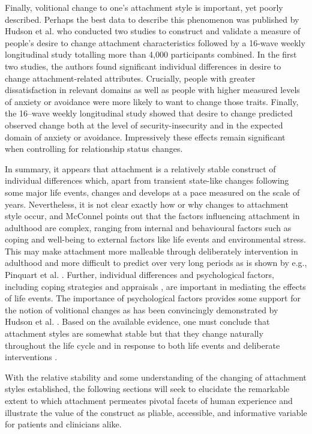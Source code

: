 \documentclass[12pt]{report}
\begin{document}
Finally, volitional change to one's attachment style is important, yet poorly described.
Perhaps the best data to describe this phenomenon was published by Hudson et al. \citeyear{Hudson2020} who conducted two studies to construct and validate a measure of people's desire to change attachment characteristics followed by a 16-wave weekly longitudinal study totalling more than 4,000 participants combined.
In the first two studies, the authors found significant individual differences in desire to change attachment-related attributes.
Crucially, people with greater dissatisfaction in relevant domains as well as people with higher measured levels of anxiety or avoidance were more likely to want to change those traits.
Finally, the 16–wave weekly longitudinal study showed that desire to change predicted observed change both at the level of security-insecurity and in the expected domain of anxiety or avoidance.
Impressively these effects remain significant when controlling for relationship status changes.

In summary, it appears that attachment is a relatively stable construct of individual differences which, apart from transient state-like changes following some major life events, changes and develops at a pace measured on the scale of years.
Nevertheless, it is not clear exactly how or why changes to attachment style occur, and McConnel \citeyear{McConnell2011} points out that the factors influencing attachment in adulthood are complex, ranging from internal and behavioural factors such as coping and well-being to external factors like life events and environmental stress.
This may make attachment more malleable through deliberately intervention in adulthood and more difficult to predict over very long periods as is shown by e.g., Pinquart et al. \citeyear{Pinquart2013}.
Further, individual differences and psychological factors, including coping strategies \cite{Zhang2004} and appraisals , are important in mediating the effects of life events.
The importance of psychological factors provides some support for the notion of volitional changes as has been convincingly demonstrated by Hudson et al. \citeyear{Hudson2020}.
Based on the available evidence, one must conclude that attachment styles are somewhat stable but that they change naturally throughout the life cycle \cite{Rowe2005,Doherty2004,Fraley1997} and in response to both life events \cite{Fraley2021} and deliberate interventions \cite{Hudson2020}.

With the relative stability and some understanding of the changing of attachment styles established, the following sections will seek to elucidate the remarkable extent to which attachment permeates pivotal facets of human experience and illustrate the value of the construct as pliable, accessible, and informative variable for patients and clinicians alike.
\end{document}

